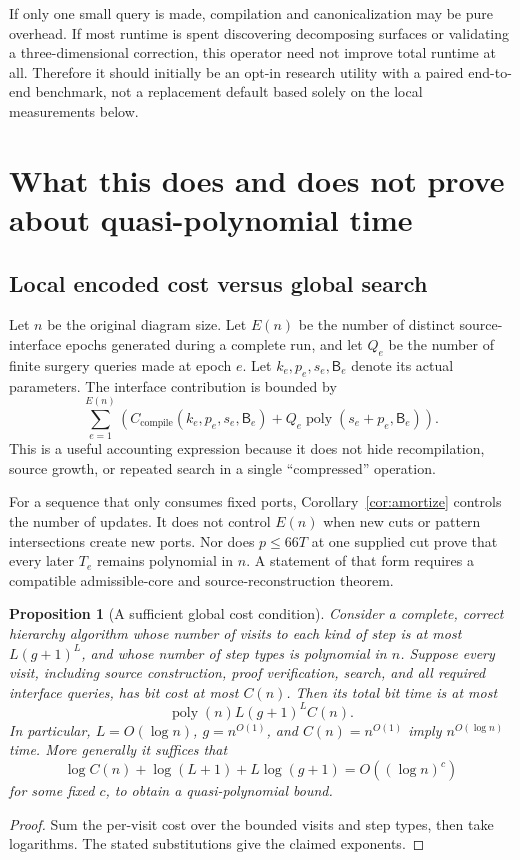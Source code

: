 \documentclass[11pt]{article}
\newtheorem{proposition}[theorem]{Proposition}
\theoremstyle{definition}
\theoremstyle{remark}\newtheorem{remark}[theorem]{Remark}
\newcommand{\bits}{\mathsf B}
\begin{document}
If only one small query is made, compilation and canonicalization may be pure overhead. If most runtime is spent discovering decomposing surfaces or validating a three-dimensional correction, this operator need not improve total runtime at all. Therefore it should initially be an opt-in research utility with a paired end-to-end benchmark, not a replacement default based solely on the local measurements below.

\section{What this does and does not prove about quasi-polynomial time}
\label{sec:global}

\subsection{Local encoded cost versus global search}
Let $n$ be the original diagram size. Let $E(n)$ be the number of distinct source-interface epochs generated during a complete run, and let $Q_e$ be the number of finite surgery queries made at epoch $e$. Let $k_e,p_e,s_e,\bits_e$ denote its actual parameters. The interface contribution is bounded by
\begin{equation}\label{eq:epoch-cost}
 \sum_{e=1}^{E(n)}
 \left(C_{\mathrm{compile}}(k_e,p_e,s_e,\bits_e)
       +Q_e\operatorname{poly}(s_e+p_e,\bits_e)\right).
\end{equation}
This is a useful accounting expression because it does not hide recompilation, source growth, or repeated search in a single ``compressed'' operation.

For a sequence that only consumes fixed ports, Corollary~\ref{cor:amortize} controls the number of updates. It does not control $E(n)$ when new cuts or pattern intersections create new ports. Nor does $p\le66T$ at one supplied cut prove that every later $T_e$ remains polynomial in $n$. A statement of that form requires a compatible admissible-core and source-reconstruction theorem.

\begin{proposition}[A sufficient global cost condition]\label{prop:global}
Consider a complete, correct hierarchy algorithm whose number of visits to each kind of step is at most $L(g+1)^L$, and whose number of step types is polynomial in $n$. Suppose every visit, including source construction, proof verification, search, and all required interface queries, has bit cost at most $C(n)$. Then its total bit time is at most
\[
                 \operatorname{poly}(n)L(g+1)^L C(n).
\]
In particular, $L=O(\log n)$, $g=n^{O(1)}$, and $C(n)=n^{O(1)}$ imply $n^{O(\log n)}$ time. More generally it suffices that
\[
  \log C(n)+\log(L+1)+L\log(g+1)=O((\log n)^c)
\]
for some fixed $c$, to obtain a quasi-polynomial bound.
\end{proposition}
\begin{proof}
Sum the per-visit cost over the bounded visits and step types, then take logarithms. The stated substitutions give the claimed exponents.
\end{proof}
\end{document}
